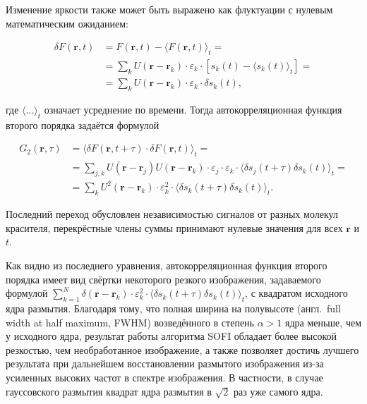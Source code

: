 Изменение яркости также может быть выражено как флуктуации с нулевым математическим ожиданием:

\begin{align*}
	\delta F\left(\mathbf{r},t\right) &= F\left(\mathbf{r},t\right)-\langle F\left(\mathbf{r},t\right) \rangle_t = \\
	&= \sum_{k} {U\left(\mathbf{r} - \mathbf{r}_k\right) \cdot \varepsilon_k \cdot \left[ s_k\left(t\right)- \langle s_k\left(t\right) \rangle_t \right]} = \\
	&= \sum_{k} {U\left(\mathbf{r} - \mathbf{r}_k\right) \cdot \varepsilon_k \cdot \delta s_k \left(t\right)},
\end{align*}

\noindent где $\langle \ldots \rangle_t$ означает усреднение по времени. Тогда автокорреляционная функция второго порядка задаётся формулой

\begin{align*}
	G_2\left(\mathbf{r},\tau\right) &= \langle \delta F\left(\mathbf{r},t+\tau\right)\cdot\delta F\left(\mathbf{r},t\right) \rangle_t = \\
	&= \sum_{j,k} {U\left(\mathbf{r}-\mathbf{r}_j\right)U\left(\mathbf{r}-\mathbf{r}_k\right)\cdot\varepsilon_j\cdot\varepsilon_k\cdot \langle \delta s_j\left(t+\tau\right)\delta s_k\left(t\right) \rangle_t} = \\
	&= \sum_{k} {U^2\left(\mathbf{r}-\mathbf{r}_k\right)\cdot\varepsilon_k^2\cdot \langle \delta s_k\left(t+\tau\right)\delta s_k\left(t\right) \rangle_t}.
\end{align*}

Последний переход обусловлен независимостью сигналов от разных молекул красителя, перекрёстные члены суммы принимают нулевые значения для всех $\mathbf{r}$ и $t$.

Как видно из последнего уравнения, автокорреляционная функция второго порядка имеет вид свёртки некоторого резкого изображения, задаваемого формулой $\sum_{k=1}^{N} {\delta(\mathbf{r}-\mathbf{r}_k)\cdot\varepsilon_k^2\cdot \langle \delta s_k\left(t+\tau\right)\delta s_k\left(t\right) \rangle_t}$, с квадратом исходного ядра размытия. Благодаря тому, что полная ширина на полувысоте (англ.~full width at half maximum, FWHM) возведённого в степень $\alpha>1$ ядра меньше, чем у исходного ядра, результат работы алгоритма SOFI обладает более высокой резкостью, чем необработанное изображение, а также позволяет достичь лучшего результата при дальнейшем восстановлении размытого изображения из-за усиленных высоких частот в спектре изображения. В частности, в случае гауссовского размытия квадрат ядра размытия в $\sqrt{2}$ раз уже самого ядра.

